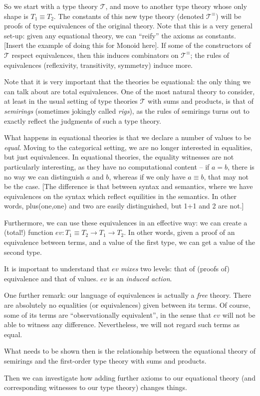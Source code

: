 So we start with a type theory $\mathcal{T}$, and move to another type theory whose only shape is $T_1\equiv T_2$.
The constants of this new type theory (denoted $\mathcal{T}^{\equiv}$) will be
proofs of type equivalences of the original theory.  Note that this is a very
general set-up: given any equational theory, we can ``reify'' the axioms as
constants.  [Insert the example
of doing this for Monoid here].  If some of the constructors of $\mathcal{T}$ respect equivalences, then this induces
combinators on $\mathcal{T}^{\equiv}$; the rules of equivalences (reflexivity, transitivity, symmetry) induce more.

Note that it is very important that the theories be equational: the only thing we can talk about are total equivalences.  
One of the most natural theory to consider, at least in the usual setting of type theories $\mathcal{T}$ with 
sums and products, is that of \emph{semirings} (sometimes jokingly called \emph{rigs}), as the rules of semirings
turns out to exactly reflect the judgments of such a type theory. 

What happens in equational theories is that we declare a number of values to be \emph{equal}.  Moving to the categorical
setting, we are no longer interested in equalities, but just equivalences.  In equational theories, the equality
witnesses are not particularly interesting, as they have no computational content  -- if $a = b$, there is no way we can
distinguish $a$ and $b$, whereas if we only have $a \equiv b$, that may not be the case.  [The difference is that
between syntax and semantics, where we have equivalences on the syntax which reflect equilities in the semantics.  In
other words, plus(one,one) and two are easily distinguished, but 1+1 and 2 are not.]

Furthermore, we can use these equivalences in an effective way: we can create a (total!) function
$ev : T_1 \equiv T_2 \rightarrow T_1 \rightarrow T_2$.  In other words, given a proof of an equivalence between terms,
and a value of the first type, we can get a value of the second type.

It is important to understand that $ev$ \emph{mixes} two levels: that of (proofs of) equivalence and that of values.
$ev$ is an \emph{induced action}.  

One further remark: our language of equivalences is actually a \emph{free} theory.  There are absolutely no
equalities (or equivalences) given between its terms.  Of course, some of its terms are ``observationally equivalent'',
in the sense that $ev$ will not be able to witness any difference.  Nevertheless, we will not regard such terms as
equal.

What needs to be shown then is the relationship between the equational theory of semirings and the first-order type
theory with sums and products.

Then we can investigate how adding further axioms to our equational theory (and corresponding witnesses to our type theory)
changes things.
